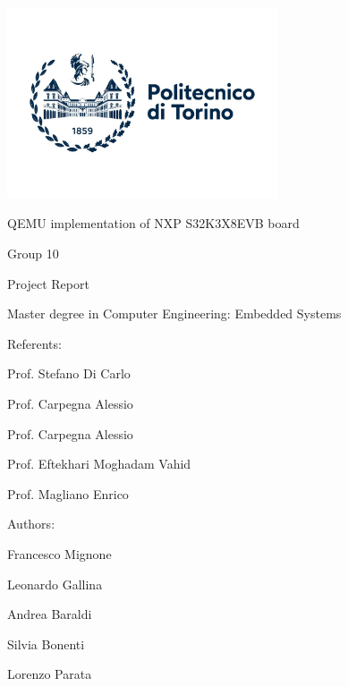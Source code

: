 \documentclass[10pt,  english, makeidx, a4paper, titlepage, oneside]{book}
\begin{document}
\frontmatter
\begin{titlepage}
\vspace{0cm}
\centerline{
\includegraphics[width=0.6\textwidth]{./polito_logo.jpg}} 
\vspace{0.5cm}
\centerline{\huge\sf QEMU implementation of NXP S32K3X8EVB board}
\vspace{1cm}
\centerline{\Huge\sf Group 10}
\bigskip
\centerline{\huge\sf Project Report}
\vspace{1cm}
\centerline{\Large Master degree in Computer Engineering: Embedded Systems}
\vspace{2.5cm}
%
{\large Referents:}

Prof. Stefano Di Carlo

Prof. Carpegna Alessio 

Prof. Carpegna Alessio

Prof. Eftekhari Moghadam Vahid

Prof. Magliano Enrico


\bigskip
\vspace{1cm}
%
%
{\large Authors:}
%
%

Francesco Mignone

Leonardo Gallina 

Andrea Baraldi

Silvia Bonenti

Lorenzo Parata
%
\begin{center}
\end{center}
\end{titlepage}



\tableofcontents

\mainmatter
%    
%






% 
%
%    
%
\appendix

% 
%
\end{document}
